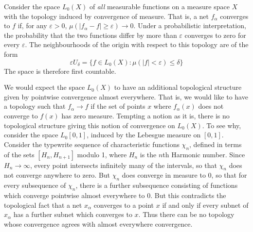 \begin{example}
    Consider the space $L_0(X)$ of {\it all} measurable functions on a measure space $X$ with the topology induced by convergence of measure. That is, a net $f_\alpha$ converges to $f$ if, for any $\varepsilon > 0$, $\mu ( |f_\alpha - f| \geq \varepsilon ) \to 0$. Under a probabilistic interpretation, the probability that the two functions differ by more than $\varepsilon$ converges to zero for every $\varepsilon$. The neighbourhoods of the origin with respect to this topology are of the form
    \[ \varepsilon U_\delta = \{ f \in L_0(X): \mu(|f| < \varepsilon) \leq \delta \} \]
    The space is therefore first countable.
\end{example}

\begin{example}
    We would expect the space $L_0(X)$ to have an additional topological structure given by pointwise convergence almost everywhere. That is, we would like to have a topology such that $f_\alpha \to f$ if the set of points $x$ where $f_\alpha(x)$ does not converge to $f(x)$ has zero measure. Tempting a notion as it is, there is no topological structure giving this notion of convergence on $L_0(X)$. To see why, consider the space $L_0[0,1]$, induced by the Lebesgue measure on $[0,1]$. Consider the typewrite sequence of characteristic functions $\chi_n$, defined in terms of the sets $[H_n, H_{n+1}]$ modulo 1, where $H_n$ is the $n$th Harmonic number. Since $H_n \to \infty$, every point intersects infinitely many of the intervals, so that $\chi_n$ does not converge anywhere to zero. But $\chi_n$ does converge in measure to 0, so that for every subsequence of $\chi_n$, there is a further subsequence consisting of functions which converge pointwise almost everywhere to 0. But this contradicts the topological fact that a net $x_\alpha$ converges to a point $x$ if and only if every subnet of $x_\alpha$ has a further subnet which converges to $x$. Thus there can be no topology whose convergence agrees with almost everywhere convergence.
\end{example}

